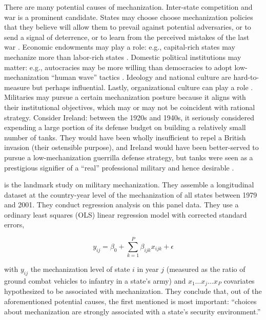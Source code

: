 \documentclass{article}
\begin{document}
There are many potential causes of mechanization. Inter-state
competition and war is a prominent candidate. States may choose choose mechanization policies 
that they believe will allow them to prevail against potential adversaries, or to send a
signal of deterrence, or to learn from the perceived mistakes of the last war
\citep{mearsheimer1983conventional,huth1988extended,murray2011military}. 
Economic endowments may play a role: e.g., capital-rich states may mechanize more
than labor-rich states \citep{gartzke2001democracy}. Domestic political
institutions may matter: e.g., autocracies may be more willing than democracies to adopt
low-mechanization ``human wave'' tactics
\citep{quinlivan1999coup,reiter2002democracies,brooks2008shaping,talmadge2015dictator}. 
Ideology \citep{van1984cult} and national culture \citep[e.g.][]{pollack2004arabs} are
hard-to-measure but perhaps influential. Lastly,
organizational culture can play a role \citep{builder1989masks}. Militaries may pursue a
certain mechanization posture because it aligns with their institutional
objectives, which may or may not be coincident with rational strategy. 
Consider Ireland: between the 1920s and 1940s, it seriously considered expending a 
large portion of its defense budget on building a relatively small number of tanks. 
They would have been wholly insufficient to repel a British invasion (their ostensible purpose), 
and Ireland would have been better-served to pursue a low-mechanization guerrilla defense strategy, 
but tanks were seen as a prestigious signifier of a ``real'' professional
military and hence desirable
\citep{farrell1998professionalization,farrell2001transnational}. 

\citet{sechser2010army} is the landmark study on military mechanization. They
assemble a longitudinal dataset at the country-year level of the mechanization
of all states between 1979 and 2001. They conduct regression analysis on this
panel data. They use a ordinary least squares (OLS) linear regression model with corrected standard
errors,

\begin{equation}
y_{ij} = \beta_0 + \sum_{k=1}^P \beta_{ijk}x_{ijk} + \epsilon
\end{equation}

with $y_{ij}$ the mechanization level of state $i$ in year $j$ (measured as the 
ratio of ground combat vehicles to infantry in a state's army) and $x_1 \ldots
x_j \ldots x_{P}$ covariates hypothesized to be associated with
mechanization. They conclude that, out of the
aforementioned potential causes, the first mentioned is most important: ``choices about
mechanization are strongly associated with a state's security environment.''
\end{document}
